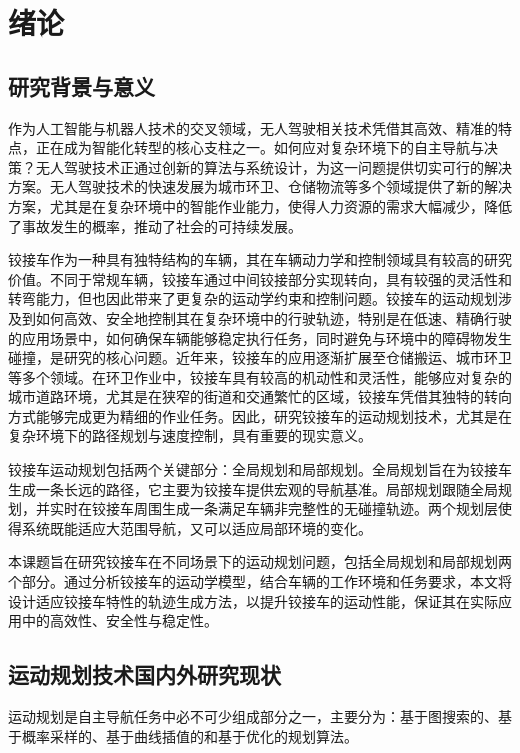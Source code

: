 \documentclass[master,academic]{ysuthesis} %
\begin{document}

	\customizedtableofcontents

	\chapter{绪论}
	\section{研究背景与意义}
	作为人工智能与机器人技术的交叉领域，无人驾驶相关技术凭借其高效、精准的特点，正在成为智能化转型的核心支柱之一。如何应对复杂环境下的自主导航与决策？无人驾驶技术正通过创新的算法与系统设计，为这一问题提供切实可行的解决方案。无人驾驶技术的快速发展为城市环卫、仓储物流等多个领域提供了新的解决方案，尤其是在复杂环境中的智能作业能力，使得人力资源的需求大幅减少，降低了事故发生的概率，推动了社会的可持续发展。

	铰接车作为一种具有独特结构的车辆，其在车辆动力学和控制领域具有较高的研究价值。不同于常规车辆，铰接车通过中间铰接部分实现转向，具有较强的灵活性和转弯能力，但也因此带来了更复杂的运动学约束和控制问题。铰接车的运动规划涉及到如何高效、安全地控制其在复杂环境中的行驶轨迹，特别是在低速、精确行驶的应用场景中，如何确保车辆能够稳定执行任务，同时避免与环境中的障碍物发生碰撞，是研究的核心问题。近年来，铰接车的应用逐渐扩展至仓储搬运、城市环卫等多个领域。在环卫作业中，铰接车具有较高的机动性和灵活性，能够应对复杂的城市道路环境，尤其是在狭窄的街道和交通繁忙的区域，铰接车凭借其独特的转向方式能够完成更为精细的作业任务。因此，研究铰接车的运动规划技术，尤其是在复杂环境下的路径规划与速度控制，具有重要的现实意义。
	
	铰接车运动规划包括两个关键部分：全局规划和局部规划。全局规划旨在为铰接车生成一条长远的路径，它主要为铰接车提供宏观的导航基准。局部规划跟随全局规划，并实时在铰接车周围生成一条满足车辆非完整性的无碰撞轨迹。两个规划层使得系统既能适应大范围导航，又可以适应局部环境的变化。

	本课题旨在研究铰接车在不同场景下的运动规划问题，包括全局规划和局部规划两个部分。通过分析铰接车的运动学模型，结合车辆的工作环境和任务要求，本文将设计适应铰接车特性的轨迹生成方法，以提升铰接车的运动性能，保证其在实际应用中的高效性、安全性与稳定性。
	\section{运动规划技术国内外研究现状}
	运动规划是自主导航任务中必不可少组成部分之一，主要分为：基于图搜索的、基于概率采样的、基于曲线插值的和基于优化的规划算法。
\end{document}
